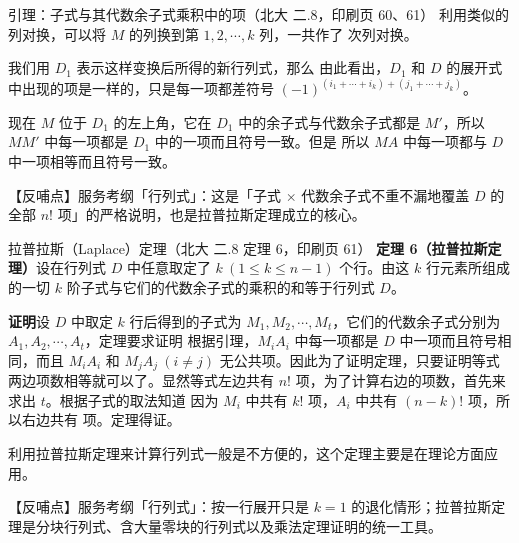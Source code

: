 \begin{fdeep}{引理：子式与其代数余子式乘积中的项（北大 二.8，印刷页 60、61）}
利用类似的列对换，可以将 $M$ 的列换到第 $1,2,\cdots,k$ 列，一共作了
次列对换。

我们用 $D_1$ 表示这样变换后所得的新行列式，那么
由此看出，$D_1$ 和 $D$ 的展开式中出现的项是一样的，只是每一项都差符号 $(-1)^{(i_1+\cdots+i_k)+(j_1+\cdots+j_k)}$。

现在 $M$ 位于 $D_1$ 的左上角，它在 $D_1$ 中的余子式与代数余子式都是 $M'$，所以 $MM'$ 中每一项都是 $D_1$ 中的一项而且符号一致。但是
所以 $MA$ 中每一项都与 $D$ 中一项相等而且符号一致。

【反哺点】服务考纲「行列式」：这是「子式 $\times$ 代数余子式不重不漏地覆盖 $D$ 的全部 $n!$ 项」的严格说明，也是拉普拉斯定理成立的核心。
\end{fdeep}

\begin{fdeep}{拉普拉斯（Laplace）定理（北大 二.8 定理 6，印刷页 61）}
\textbf{定理 6（拉普拉斯定理）}\quad 设在行列式 $D$ 中任意取定了 $k\ (1\le k\le n-1)$ 个行。由这 $k$ 行元素所组成的一切 $k$ 阶子式与它们的代数余子式的乘积的和等于行列式 $D$。

\textbf{证明}\quad 设 $D$ 中取定 $k$ 行后得到的子式为 $M_1,M_2,\cdots,M_t$，它们的代数余子式分别为 $A_1,A_2,\cdots,A_t$，定理要求证明
根据引理，$M_iA_i$ 中每一项都是 $D$ 中一项而且符号相同，而且 $M_iA_i$ 和 $M_jA_j\ (i\ne j)$ 无公共项。因此为了证明定理，只要证明等式两边项数相等就可以了。显然等式左边共有 $n!$ 项，为了计算右边的项数，首先来求出 $t$。根据子式的取法知道
因为 $M_i$ 中共有 $k!$ 项，$A_i$ 中共有 $(n-k)!$ 项，所以右边共有
项。定理得证。

利用拉普拉斯定理来计算行列式一般是不方便的，这个定理主要是在理论方面应用。

【反哺点】服务考纲「行列式」：按一行展开只是 $k=1$ 的退化情形；拉普拉斯定理是分块行列式、含大量零块的行列式以及乘法定理证明的统一工具。
\end{fdeep}

